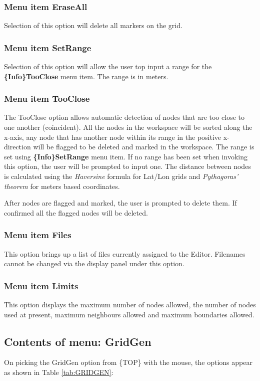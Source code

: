 \documentclass{article}
\begin{document}
\subsubsection{Menu item EraseAll}
Selection of this option will delete all markers on the grid.

\subsubsection[Menu item SetRange]{Menu item SetRange}
Selection of this option will allow the user top input a range for the \textbf{\{Info\}TooClose} menu item. The range is in meters.

\subsubsection[Menu item TooClose]{Menu item TooClose}

The TooClose option allows automatic detection of nodes that are too close to one another (coincident). All the nodes in the workspace will be sorted along the x-axis, any node that has another node within its range in the positive x-direction will be flagged to be deleted and marked in the workspace. The range is set using \textbf{\{Info\}SetRange} menu item. If no range has been set when invoking this option, the user will be prompted to input one. The distance between nodes is calculated using the \emph{Haversine} formula for Lat/Lon grids and \emph{Pythagoras' theorem} for meters based coordinates.

After nodes are flagged and marked, the user is prompted to delete them. If confirmed all the flagged nodes will be deleted.

\subsubsection[Menu item Files]{Menu item Files}
This option brings up a list of files currently assigned to the Editor. Filenames cannot be changed via the display panel under this option.

\subsubsection[Menu item Limits]{Menu item Limits}
This option displays the maximum number of nodes allowed, the number of nodes used at present, maximum neighbours allowed and maximum boundaries allowed.

\subsection{Contents of menu: GridGen}
On picking the GridGen option from \{TOP\} with the mouse, the options appear as shown in Table \ref{tab:GRIDGEN}:
\end{document}
